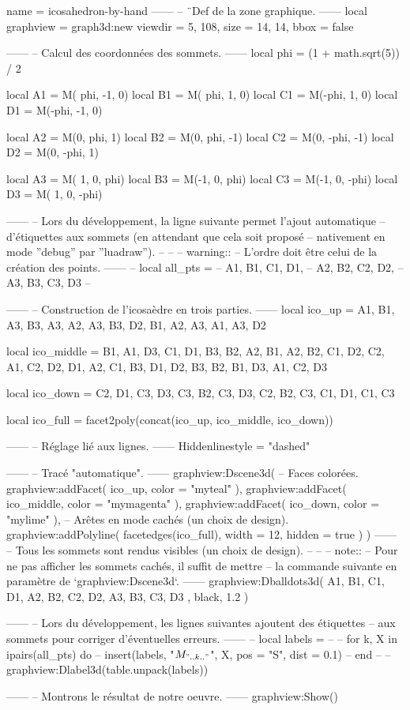 \documentclass[border = 3pt]{standalone}
\begin{document}
\begin{luadraw*}{name = icosahedron-by-hand}
------
-- ¨Def de la zone graphique.
------
local graphview = graph3d:new{
  viewdir  = {5, 108},
  size     = {14, 14},
  bbox     = false
}

------
-- Calcul des coordonnées des sommets.
------
local phi = (1 + math.sqrt(5)) / 2

local A1 = M( phi, -1, 0)
local B1 = M( phi,  1, 0)
local C1 = M(-phi,  1, 0)
local D1 = M(-phi, -1, 0)

local A2 = M(0,  phi,  1)
local B2 = M(0,  phi, -1)
local C2 = M(0, -phi, -1)
local D2 = M(0, -phi,  1)

local A3 = M( 1, 0,  phi)
local B3 = M(-1, 0,  phi)
local C3 = M(-1, 0, -phi)
local D3 = M( 1, 0, -phi)

------
-- Lors du développement, la ligne suivante permet l'ajout automatique
-- d'étiquettes aux sommets (en attendant que cela soit proposé
-- nativement en mode ''debug'' par ''luadraw'').
--
--
--  warning::
--      L'ordre doit être celui de la création des points.
------
-- local all_pts = {
--   A1, B1, C1, D1,
--   A2, B2, C2, D2,
--   A3, B3, C3, D3
-- }

------
-- Construction de l'icosaèdre en trois parties.
------
local ico_up = {
  {A1, B1, A3},
  {B3, A3, A2},
  {A3, B3, D2},
  {B1, A2, A3},
  {A1, A3, D2}
}

local ico_middle = {
  {B1, A1, D3},
  {C1, D1, B3},
  {B2, A2, B1},
  {A2, B2, C1},
  {D2, C2, A1},
  {C2, D2, D1},
  {A2, C1, B3},
  {D1, D2, B3},
  {B2, B1, D3},
  {A1, C2, D3}
}

local ico_down = {
  {C2, D1, C3},
  {D3, C3, B2},
  {C3, D3, C2},
  {B2, C3, C1},
  {D1, C1, C3}
}

local ico_full = facet2poly(concat(ico_up, ico_middle, ico_down))

------
-- Réglage lié aux lignes.
------
Hiddenlinestyle = "dashed"

------
-- Tracé "automatique".
------
graphview:Dscene3d(
-- Faces colorées.
  graphview:addFacet(
    ico_up,
    {
      color = "myteal"
    }
  ),
  graphview:addFacet(
    ico_middle,
    {
      color = "mymagenta"
    }
  ),
  graphview:addFacet(
    ico_down,
    {
      color = "mylime"
    }
  ),
-- Arêtes en mode cachés (un choix de design).
  graphview:addPolyline(
    facetedges(ico_full),
    {
      width = 12,
      hidden = true
    }
  )
)
------
-- Tous les sommets sont rendus visibles (un choix de design).
--
--
-- note::
--     Pour ne pas afficher les sommets cachés, il suffit de mettre
--     la commande suivante en paramètre de `graphview:Dscene3d`.
------
graphview:Dballdots3d(
  {
    A1, B1, C1, D1,
    A2, B2, C2, D2,
    A3, B3, C3, D3
  },
  black,
  1.2
)

------
-- Lors du développement, les lignes suivantes ajoutent des étiquettes
-- aux sommets pour corriger d'éventuelles erreurs.
------
-- local labels = {}
--
-- for k, X in ipairs(all_pts) do
--   insert(labels, {"$M_{".. k .."}$", X, {pos = "S", dist = 0.1}})
-- end
--
-- graphview:Dlabel3d(table.unpack(labels))

------
-- Montrons le résultat de notre oeuvre.
------
graphview:Show()
\end{luadraw*}
\end{document}
